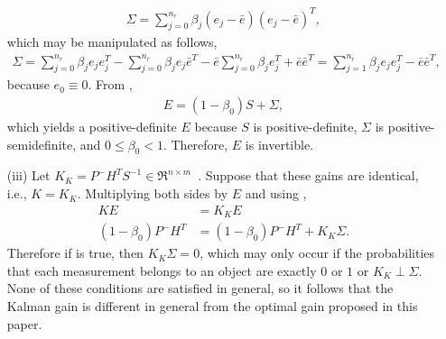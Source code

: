 \begin{appendix}
\begin{itemize}
\begin{align}
\Sigma=\sum\limits_{j=0}^{n_r}\beta_{j}(e_{j}-{\bar{e}})(e_{j}-{\bar{e}})^T,
\end{align}
which may be manipulated as follows,
\begin{align}
\Sigma=\sum\limits_{j=0}^{n_r}\beta_{j}e_{j}e_{j}^T
-\sum\limits_{j=0}^{n_r}\beta_{j}e_{j}{\bar{e}}^T
-{\bar{e}}\sum\limits_{j=0}^{n_r}\beta_{j}e_{j}^T
+{\bar{e}}{\bar{e}}^T
=\sum\limits_{j=1}^{n_r}\beta_{j}e_{j}e_{j}^T-{\bar{e}}{\bar{e}}^T,
\label{eqn:CovSpreadPSD}
\end{align}
because $e_{0}\equiv0$.
From ,
\begin{align}
E=(1-\beta_{0})S+\Sigma,
\end{align}
which yields a positive-definite $E$ because $S$ is positive-definite, $\Sigma$ is positive-semidefinite, and $0\leq\beta_{0}<1$.
Therefore, $E$ is invertible.
\item[(iii)] Let $K_{K}=P^-H^TS^{-1}\in\Re^{n\times m}$~\cite{TrackDataAssoc}.
Suppose that these gains are identical, i.e., $K=K_K$.
Multiplying both sides by $E$ and using ,
\begin{align}
KE&=K_{K}E\nonumber
\\
(1-\beta_{0})P^-H^T&=
(1-\beta_{0})P^-H^T+K_{K}\Sigma.
\label{eqn:KalMUareSame}
\end{align}
Therefore if  is true, then $K_{K}\Sigma=0$, which may only occur if the probabilities that each measurement belongs to an object are exactly $0$ or $1$ or $K_{K}\perp\Sigma$.
None of these conditions are satisfied in general, so it follows that the Kalman gain is different in general from the optimal gain proposed in this paper.


\end{itemize}
\end{appendix}
